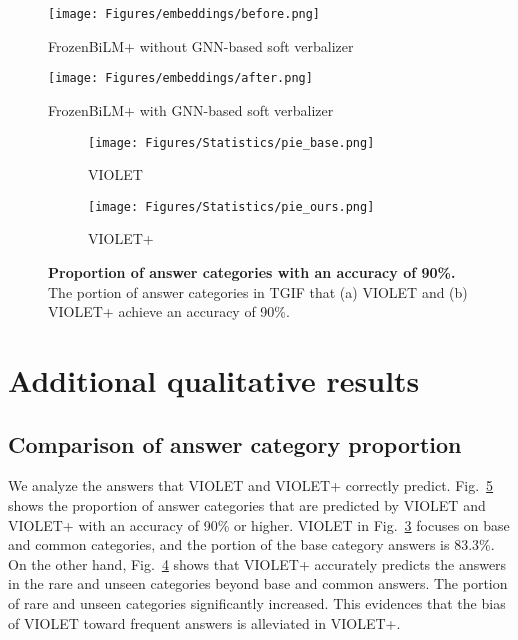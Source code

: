 \documentclass[10pt,twocolumn,letterpaper]{article}
\begin{document}
\begin{table}[t!]
\end{table} \begin{figure*}[t] 
    \centering
    \begin{subfigure}[t]{0.49\linewidth}
        \texttt{[image: Figures/embeddings/before.png]}
        \caption{FrozenBiLM+ without GNN-based soft verbalizer}
        \label{fig:before}
    \end{subfigure}
    \begin{subfigure}[t]{0.49\linewidth}
        \texttt{[image: Figures/embeddings/after.png]}
        \caption{FrozenBiLM+ with GNN-based soft verbalizer}
        \label{fig:after}
    \end{subfigure}
    \caption{\textbf{TSNE of answer embeddings before/after adapting GNN-based soft verbalizer.}
     is an output feature of the [MASK] token.
    The prediction of the model is changed from ``water'' in (a) to ``wooden boat'' in (b).
    }
    \label{fig:embeddings}
\end{figure*} \begin{figure}[t!] 
    \centering
    \begin{subfigure}[t]{0.44\linewidth}
        \texttt{[image: Figures/Statistics/pie\_base.png]}
        \caption{VIOLET}
        \label{fig:pie_base}
    \end{subfigure}
    \begin{subfigure}[t]{0.45\linewidth}
        \texttt{[image: Figures/Statistics/pie\_ours.png]}
        \caption{VIOLET+}
        \label{fig:pie_ours}
    \end{subfigure}
    \caption{\textbf{Proportion of answer categories with an accuracy of 90\%.}
    The portion of answer categories in TGIF that (a) VIOLET and (b) VIOLET+ achieve an accuracy of 90\%. 
    }
    \label{fig:pie}
\end{figure} \section{Additional qualitative results}

\subsection{Comparison of answer category proportion}
We analyze the answers that VIOLET and VIOLET+ correctly predict. 
Fig.~\ref{fig:pie} shows the proportion of answer categories that are predicted by VIOLET and VIOLET+ with an accuracy of 90\% or higher.
VIOLET in Fig.~\ref{fig:pie_base} focuses on base and common categories, and the portion of the base category answers is 83.3\%. 
On the other hand, Fig.~\ref{fig:pie_ours} shows that VIOLET+ accurately predicts the answers in the rare and unseen categories beyond base and common answers.
The portion of rare and unseen categories significantly increased. 
This evidences that the bias of VIOLET toward frequent answers is alleviated in VIOLET+.
\end{document}
